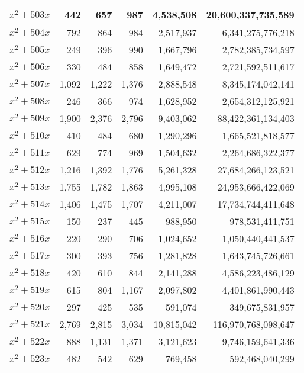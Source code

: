 \documentclass[a4paper]{amsproc}
\theoremstyle{plain}
\begin{document}
\begin{longtable}{ | l | r | r | r | r | r | }
$x^2 + 503x$ & 442 & 657 & 987 & 4{,}538{,}508 & 20{,}600{,}337{,}735{,}589 \\ \hline
$x^2 + 504x$ & 792 & 864 & 984 & 2{,}517{,}937 & 6{,}341{,}275{,}776{,}218 \\ \hline
$x^2 + 505x$ & 249 & 396 & 990 & 1{,}667{,}796 & 2{,}782{,}385{,}734{,}597 \\ \hline
$x^2 + 506x$ & 330 & 484 & 858 & 1{,}649{,}472 & 2{,}721{,}592{,}511{,}617 \\ \hline
$x^2 + 507x$ & 1{,}092 & 1{,}222 & 1{,}376 & 2{,}888{,}548 & 8{,}345{,}174{,}042{,}141 \\ \hline
$x^2 + 508x$ & 246 & 366 & 974 & 1{,}628{,}952 & 2{,}654{,}312{,}125{,}921 \\ \hline
$x^2 + 509x$ & 1{,}900 & 2{,}376 & 2{,}796 & 9{,}403{,}062 & 88{,}422{,}361{,}134{,}403 \\ \hline
$x^2 + 510x$ & 410 & 484 & 680 & 1{,}290{,}296 & 1{,}665{,}521{,}818{,}577 \\ \hline
$x^2 + 511x$ & 629 & 774 & 969 & 1{,}504{,}632 & 2{,}264{,}686{,}322{,}377 \\ \hline
$x^2 + 512x$ & 1{,}216 & 1{,}392 & 1{,}776 & 5{,}261{,}328 & 27{,}684{,}266{,}123{,}521 \\ \hline
$x^2 + 513x$ & 1{,}755 & 1{,}782 & 1{,}863 & 4{,}995{,}108 & 24{,}953{,}666{,}422{,}069 \\ \hline
$x^2 + 514x$ & 1{,}406 & 1{,}475 & 1{,}707 & 4{,}211{,}007 & 17{,}734{,}744{,}411{,}648 \\ \hline
$x^2 + 515x$ & 150 & 237 & 445 & 988{,}950 & 978{,}531{,}411{,}751 \\ \hline
$x^2 + 516x$ & 220 & 290 & 706 & 1{,}024{,}652 & 1{,}050{,}440{,}441{,}537 \\ \hline
$x^2 + 517x$ & 300 & 393 & 756 & 1{,}281{,}828 & 1{,}643{,}745{,}726{,}661 \\ \hline
$x^2 + 518x$ & 420 & 610 & 844 & 2{,}141{,}288 & 4{,}586{,}223{,}486{,}129 \\ \hline
$x^2 + 519x$ & 615 & 804 & 1{,}167 & 2{,}097{,}802 & 4{,}401{,}861{,}990{,}443 \\ \hline
$x^2 + 520x$ & 297 & 425 & 535 & 591{,}074 & 349{,}675{,}831{,}957 \\ \hline
$x^2 + 521x$ & 2{,}769 & 2{,}815 & 3{,}034 & 10{,}815{,}042 & 116{,}970{,}768{,}098{,}647 \\ \hline
$x^2 + 522x$ & 888 & 1{,}131 & 1{,}371 & 3{,}121{,}623 & 9{,}746{,}159{,}641{,}336 \\ \hline
$x^2 + 523x$ & 482 & 542 & 629 & 769{,}458 & 592{,}468{,}040{,}299 \\ \hline

\end{longtable}
\end{document}
